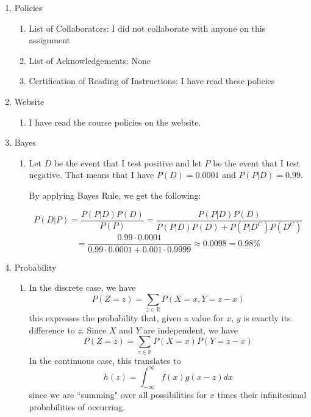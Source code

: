 \documentclass[submit]{harvardml}
\begin{document}
\renewcommand{\labelenumii}{\arabic{enumi}.\arabic{enumii}}
\renewcommand{\labelenumiii}{(\alph{enumiii})}

\begin{enumerate}
  \item Policies
  \begin{enumerate}
    \item
    List of Collaborators:
    I did not collaborate with anyone on this assignment
    
    \item
    List of Acknowledgements: None
    
    \item
    Certification of Reading of Instructions: 
    I have read these policies
  \end{enumerate}

  \item Website
  \begin{enumerate}
    \item 
    I have read the course policies on the website.
  \end{enumerate}

  \item Bayes
  \begin{enumerate}
    \item
    Let $D$ be the event that I test positive and let $P$ be the event that I test negative. That 
    means that I have $P(D) = 0.0001$ and $P(P|D) = 0.99$.

    By applying Bayes Rule, we get the following:

    $$P(D|P) = \frac{P(P|D)P(D)}{P(P)} = \frac{P(P|D)P(D)}{P(P|D)P(D) + P(P|D^C)P(D^C)}$$
    $$= \frac{0.99 \cdot 0.0001}{0.99\cdot 0.0001 + 0.001 \cdot 0.9999} \approx 0.0098 
    = \boxed{0.98\%}$$
  \end{enumerate}


  \item Probability
  \begin{enumerate}
    \item
    In the discrete case, we have
    $$P(Z=z) = \sum_{z\in\mathbb{R}} P(X=x,Y=z-x)$$
    this expresses the probability that, given a value for $x$, $y$ is exactly its difference to 
    $z$. Since $X$ and $Y$ are independent, we have
    $$P(Z=z) = \sum_{z\in\mathbb{R}} P(X=x)P(Y=z-x)$$
    In the continuous case, this translates to
    $$h(z) = \int_{-\infty}^{\infty} f(x)g(x-z)dx$$
    since we are ``summing" over all possibilities for $x$ times their infinitesimal probabilities
    of occurring.



\end{enumerate}
\end{enumerate}
\end{document}
